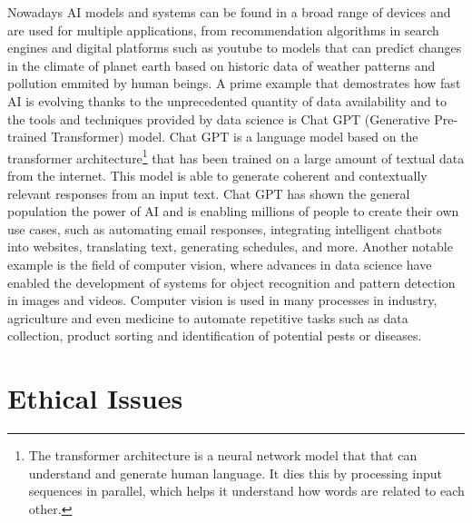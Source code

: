 \documentclass{vgtc}                          %
\begin{document}
Nowadays AI models and systems can be found in a broad range of devices and are used for multiple applications, from recommendation algorithms in search engines and digital platforms such as youtube to 
models that can predict changes in the climate of planet earth based on historic data of weather patterns and pollution emmited by human beings. A prime example that demostrates how fast AI is evolving 
thanks to the unprecedented quantity of data availability and to the tools and techniques provided by data science is Chat GPT (Generative Pre-trained Transformer) model. Chat GPT is a language model 
based on the transformer architecture\footnote{The transformer architecture is a neural network model that that can understand and generate human language. It dies this by processing input sequences in 
parallel, which helps it understand how words are related to each other.} that has been trained on a large amount of textual data from the internet. This model is able to generate coherent and contextually 
relevant responses from an input text. Chat GPT has shown the general population the power of AI and is enabling millions of people to create their own use cases, such as automating email responses, 
integrating intelligent chatbots into websites, translating text, generating schedules, and more. Another notable example is the field of computer vision, where advances in data science have enabled the 
development of systems for object recognition and pattern detection in images and videos. Computer vision is used in many processes in industry, agriculture and even medicine to automate repetitive tasks 
such as data collection, product sorting and identification of potential pests or diseases.

\section{Ethical Issues}
\end{document}
